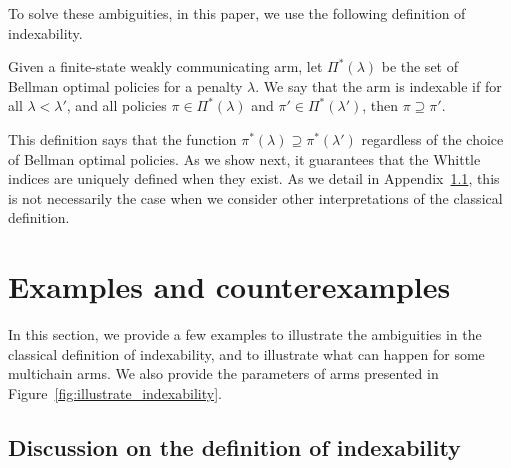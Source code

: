 To solve these ambiguities, in this paper, we use the following definition of indexability.  
\begin{defn}
    \label{defn:indexability}
    Given a finite-state weakly communicating arm, let $\Pi^*(\lambda)$ be the set of Bellman optimal policies for a penalty $\lambda$.
    We say that the arm is indexable if for all $\lambda<\lambda'$, and all policies $\pi\in\Pi^*(\lambda)$ and $\pi'\in\Pi^*(\lambda')$, then $\pi\supseteq\pi'$.
\end{defn}
This definition says that the function $\pi^*(\lambda)\supseteq\pi^*(\lambda')$ regardless of the choice of Bellman optimal policies. As we show next, it guarantees that the Whittle indices are uniquely defined when they exist. As we detail in Appendix~\ref{apx:discussion_index}, this is not necessarily the case when we consider other interpretations of the classical definition.


\section{Examples and counterexamples}

In this section, we provide a few examples to illustrate the ambiguities in the classical definition of indexability, and to illustrate what can happen for some multichain arms. We also provide the parameters of arms presented in Figure~\ref{fig:illustrate_indexability}.

\subsection{Discussion on the definition of indexability}
\label{apx:discussion_index}

